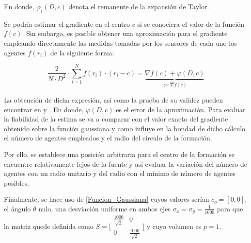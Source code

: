 En donde, $\varphi_i\left(D,c\right)$ denota el remanente de la expansión de Taylor. 

Se podría estimar el gradiente en el centro $c$ si se conociera el valor de la función $f\left(c\right)$. Sin embargo, es posible obtener una aproximación para el gradiente empleando directamente las medidas tomadas por los sensores de cada uno los agentes $f\left(r_i\right)$ de la siguiente forma:

\begin{equation}\label{Fun_Esti}
	\frac{2}{N\cdot{D}^2}\cdot\sum_{i=1}^{N}f(r_{i})\cdot(r_{i}-c)=\underbrace{\nabla{f}\left(c\right) + \varphi\left(D,c\right)}_{:=\hat{\nabla}{f}\left(c\right)}
\end{equation}

La obtención de dicha expresión, así como la prueba de su validez pueden encontrar en \cite{Estimacion_Gradiente} y \cite{Adicional_Estimacion_1}. En donde, $\varphi\left(D,c\right)$ es el error de la aproximación. 
\newpage
Para evaluar la fiabilidad de la estima se va a comparar con el valor exacto del gradiente obtenido sobre la función gaussiana y como influye en la bondad de dicho cálculo el número de agentes empleados y el radio del círculo de la formación.

Por ello, se establece una posición arbitraria para el centro de la formación  se encuentre relativamente lejos de la fuente y así evaluar la variación del número de agentes con un radio unitario y del radio con el mínimo de número de agentes posibles.

Finalmente, se hace uso de \ref{Funcion_Gaussiana} cuyos valores serían $c_{o}=[0,0]$, el ángulo $\theta$ nulo, una desviación uniforme en ambos ejes $\sigma_{x}=\sigma_{y}=\frac{1}{1000}$ para que la matriz quede definida como $S = \bigl[\begin{smallmatrix}\frac{1000}{\sqrt{2}} & 0\\ 0 & \frac{1000}{\sqrt{2}}\end{smallmatrix}\bigr]$  y cuyo volumen es $p = 1$.


